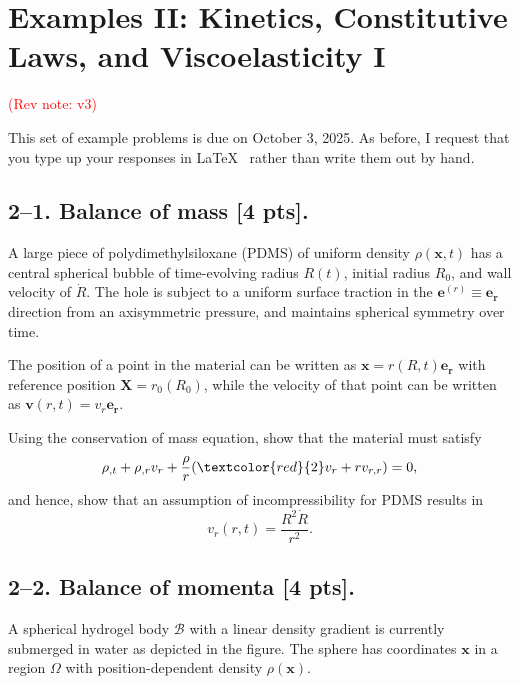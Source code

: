 \setcounter{section}{1} %


\section*{Examples II: Kinetics, Constitutive Laws, and Viscoelasticity I}
\label{PS2}
\textcolor{red}{(Rev note: v3)}


This set of example problems is due on October 3, 2025. 
As before, I request that you type up your responses in \LaTeX~ rather than write them out by hand. 

\medskip
\subsection*{2--1. \textbf{Balance of mass} [4 pts].} 
A large piece of polydimethylsiloxane (PDMS) of uniform density $\rho(\bm{x},t)$ has a central spherical bubble of time-evolving radius $R(t)$, initial radius $R_0$, and wall velocity of $\dot{R}$. 
The hole is subject to a uniform surface traction in the $\bm{e}^{(r)} \equiv \bm{e}_{\bm{r}}$ direction from an axisymmetric pressure, and maintains spherical symmetry over time. 

\medskip
The position of a point in the material can be written as $\bm{x} = r(R,t) \bm{e}_{\bm{r}}$ with reference position $\bm{X} = r_0(R_0)$, while the velocity of that point can be written as $\bm{v}(r,t) = v_r \bm{e}_{\bm{r}}$.

\medskip
Using the conservation of mass equation, show that the material must satisfy
\begin{equation*}
\rho_{,t}+ \rho_{,r} v_r + \frac{\rho}{r} (\textcolor{red}{2}v_r + r v_{r,r}) = 0,
\end{equation*}
and hence, show that an assumption of incompressibility for PDMS results in 
\begin{equation*}
v_r(r,t) = \frac{R^2 \dot{R}}{r^2}.
\end{equation*}

\medskip
\subsection*{2--2. \textbf{Balance of momenta} [4 pts].} A spherical hydrogel body $\mathcal{B}$ with a linear density gradient is currently submerged in water as depicted in the figure. 
The sphere has coordinates $\bm{x}$ in a region $\Omega$ with position-dependent density $\rho(\bm{x})$. 

